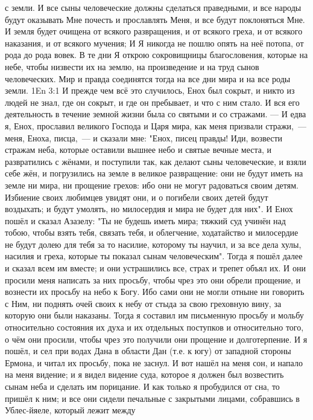 с земли.
И все сыны человеческие должны сделаться праведными, и все народы
будут оказывать Мне почесть и прославлять Меня, и все будут поклоняться Мне.
И земля будет очищена от всякого развращения, и от всякого греха, и
от всякого наказания, и от всякого мучения; И Я никогда не пошлю опять на неё
потопа, от рода до рода вовек.
В те дни Я открою сокровищницы благословения, которые на небе,
чтобы низвести их на землю, на произведение и на труд сынов человеческих.
Мир и правда соединятся тогда на все дни мира и на все роды земли.
\vs 1En 3:1
И прежде чем всё это случилось, Енох был сокрыт, и никто из
людей не знал, где он сокрыт, и где он пребывает, и что с ним стало.
И вся его деятельность в течение земной жизни была со святыми и со
стражами.
--- И едва я, Енох, прославил великого Господа и Царя мира, как меня
призвали стражи,~--- меня, Еноха, писца,~--- и сказали мне: "Енох, писец правды!
Иди, возвести стражам неба, которые оставили вышнее небо и святые
вечные места, и развратились с жёнами, и поступили так, как делают сыны
человеческие, и взяли себе жён,  и погрузились на земле в великое
развращение: они не будут иметь на земле ни мира, ни прощение грехов: ибо они
не могут радоваться своим детям.
Избиение своих любимцев увидят они, и о погибели своих детей будут
воздыхать; и будут умолять, но милосердия и мира не будет для них".
И Енох пошёл и сказал Азазелу: "Ты не будешь иметь мира; тяжкий
суд учинён над тобою, чтобы взять тебя, связать тебя, и облегчение, ходатайство
и милосердие не будут долею для тебя за то насилие, которому ты научил, и за
все дела хулы, насилия и греха, которые ты показал сынам человеческим".
Тогда я пошёл далее и сказал всем им вместе; и они устрашились все,
страх и трепет объял их.
И они просили меня написать за них просьбу, чтобы чрез это они обрели
прощение, и вознести их просьбу на небо к Богу.
Ибо сами они не могли отныне ни говорить с Ним, ни поднять очей своих
к небу от стыда за свою греховную вину, за которую они были наказаны.
Тогда я составил им письменную просьбу и мольбу относительно
состояния их духа и их отдельных поступков и относительно того, о чём они
просили, чтобы чрез это получили они прощение и долготерпение.
И я пошёл, и сел при водах Дана в области Дан (т.е. к югу) от
западной стороны Ермона, и читал их просьбу, пока не заснул.
И вот нашёл на меня сон, и напало на меня видение; и я видел видение
суда, которое я должен был возвестить сынам неба и сделать им порицание.
И как только я пробудился от сна, то пришёл к ним; и все они сидели
печальные с закрытыми лицами, собравшись в Ублес-йяеле, который лежит между
